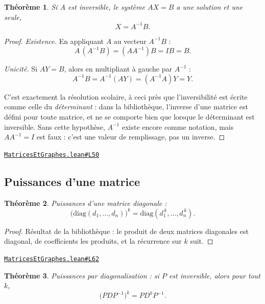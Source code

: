 \documentclass[11pt,a4paper]{article}
\theoremstyle{definition}
\theoremstyle{plain}
\newtheorem{theoreme}{Théorème}
\newcommand{\source}[2]{\par\smallskip\noindent\hfill{\footnotesize\href{#1}{\texttt{#2}}}\par\smallskip}
\begin{document}
\begin{theoreme}
Si $A$ est inversible, le système $AX = B$ a une solution et une seule,
\[ X = A^{-1}B . \]
\end{theoreme}

\begin{proof}
\emph{Existence.} En appliquant $A$ au vecteur $A^{-1}B$ :
\[ A\,(A^{-1}B) = (AA^{-1})B = IB = B . \]

\emph{Unicité.} Si $AY = B$, alors en multipliant à gauche par $A^{-1}$ :
\[ A^{-1}B = A^{-1}(AY) = (A^{-1}A)Y = Y . \]

\medskip\noindent
C'est exactement la résolution scolaire, à ceci près que l'inversibilité est écrite comme
celle du \emph{déterminant} : dans la bibliothèque, l'inverse d'une matrice est défini pour
toute matrice, et ne se comporte bien que lorsque le déterminant est inversible. Sans cette
hypothèse, $A^{-1}$ existe encore comme notation, mais $AA^{-1} = I$ est faux : c'est une
valeur de remplissage, pas un inverse.
\end{proof}
\source{https://github.com/Commutator-IO/learn-lean/blob/main/cours/02-lycee/10-specialite-mathematiques-terminale-s/MatricesEtGraphes.lean\#L50}{MatricesEtGraphes.lean\#L50}

\subsection{Puissances d'une matrice}

\begin{theoreme}
Puissances d'une matrice diagonale :
\[ \bigl(\mathrm{diag}(d_1, \dots, d_n)\bigr)^{k}
   = \mathrm{diag}(d_1^{\,k}, \dots, d_n^{\,k}) . \]
\end{theoreme}

\begin{proof}
Résultat de la bibliothèque : le produit de deux matrices diagonales est diagonal, de
coefficients les produits, et la récurrence sur $k$ suit.
\end{proof}
\source{https://github.com/Commutator-IO/learn-lean/blob/main/cours/02-lycee/10-specialite-mathematiques-terminale-s/MatricesEtGraphes.lean\#L62}{MatricesEtGraphes.lean\#L62}

\begin{theoreme}
Puissances par diagonalisation : si $P$ est inversible, alors pour tout $k$,
\[ \bigl(PDP^{-1}\bigr)^{k} = P D^{k} P^{-1} . \]
\end{theoreme}
\end{document}
